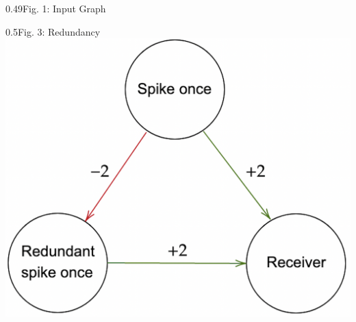 {\begin{rudifig}{0.49\hsize}{Fig. 1: Input Graph}
    \label{fig:input_graph}
\end{rudifig}
\begin{rudifig}{0.5\hsize}{Fig. 3: Redundancy}
    \includegraphics[width=1\linewidth]{latex/Images/brain_adaptation_alternative.png}
    \label{fig:eg_brain_adaptation}
\end{rudifig}


\vspace{-15em}


}
